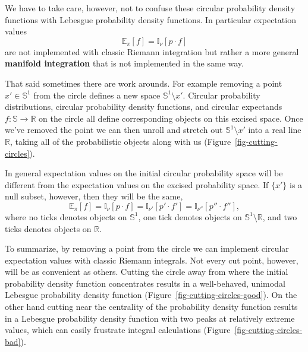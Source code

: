 \documentclass[
  letterpaper,
  DIV=11,
  numbers=noendperiod]{scrartcl}
\begin{document}
We have to take care, however, not to confuse these circular probability
density functions with Lebesgue probability density functions. In
particular expectation values \[
\mathbb{E}_{\pi}[f] = \mathbb{I}_{\nu}[p \cdot f]
\] are not implemented with classic Riemann integration but rather a
more general \textbf{manifold integration} that is not implemented in
the same way.

That said sometimes there are work arounds. For example removing a point
\(x' \in \mathbb{S}^{1}\) from the circle defines a new space
\(\mathbb{S}^{1} \setminus x'\). Circular probability distributions,
circular probability density functions, and circular expectands
\(f : \mathbb{S} \rightarrow \mathbb{R}\) on the circle all define
corresponding objects on this excised space. Once we've removed the
point we can then unroll and stretch out \(\mathbb{S}^{1} \setminus x'\)
into a real line \(\mathbb{R}\), taking all of the probabilistic objects
along with us (Figure~\ref{fig-cutting-circles}).

In general expectation values on the initial circular probability space
will be different from the expectation values on the excised probability
space. If \(\{ x' \}\) is a null subset, however, then they will be the
same, \[
\mathbb{E}_{\pi}[f]
= \mathbb{I}_{\nu}[p \cdot f]
= \mathbb{I}_{\nu'}[p' \cdot f']
= \mathbb{I}_{\nu''}[p'' \cdot f''],
\] where no ticks denotes objects on \(\mathbb{S}^{1}\), one tick
denotes objects on \(\mathbb{S}^{1} \setminus \mathbb{R}\), and two
ticks denotes objects on \(\mathbb{R}\).

To summarize, by removing a point from the circle we can implement
circular expectation values with classic Riemann integrals. Not every
cut point, however, will be as convenient as others. Cutting the circle
away from where the initial probability density function concentrates
results in a well-behaved, unimodal Lebesgue probability density
function (Figure~\ref{fig-cutting-circles-good}). On the other hand
cutting near the centrality of the probability density function results
in a Lebesgue probability density function with two peaks at relatively
extreme values, which can easily frustrate integral calculations
(Figure~\ref{fig-cutting-circles-bad}).
\end{document}

